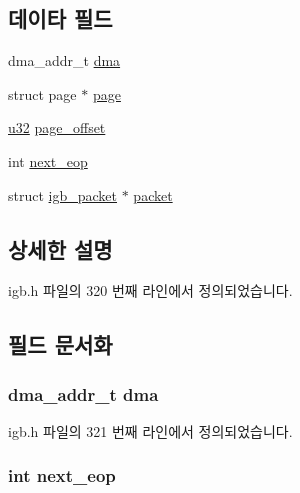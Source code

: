 \subsection*{데이타 필드}
\begin{DoxyCompactItemize}
\item 
dma\+\_\+addr\+\_\+t \hyperlink{structigb__rx__buffer_a5624e64f422a13783a01fb56a8e67747}{dma}
\item 
struct page $\ast$ \hyperlink{structigb__rx__buffer_ad45c9283ecdd581420d88bc33100364a}{page}
\item 
\hyperlink{lib_2igb_2e1000__osdep_8h_a64e91c10a0d8fb627e92932050284264}{u32} \hyperlink{structigb__rx__buffer_a4dde6949f38b527769892127f2e372d2}{page\+\_\+offset}
\item 
int \hyperlink{structigb__rx__buffer_af565101ee13ca100904a7ac5b7564a3d}{next\+\_\+eop}
\item 
struct \hyperlink{structigb__packet}{igb\+\_\+packet} $\ast$ \hyperlink{structigb__rx__buffer_ac6186670bb595d9f22c89b6dc2779d14}{packet}
\end{DoxyCompactItemize}


\subsection{상세한 설명}


igb.\+h 파일의 320 번째 라인에서 정의되었습니다.



\subsection{필드 문서화}
\subsubsection[{\texorpdfstring{dma}{dma}}]{\setlength{\rightskip}{0pt plus 5cm}dma\+\_\+addr\+\_\+t dma}\hypertarget{structigb__rx__buffer_a5624e64f422a13783a01fb56a8e67747}{}\label{structigb__rx__buffer_a5624e64f422a13783a01fb56a8e67747}


igb.\+h 파일의 321 번째 라인에서 정의되었습니다.

\subsubsection[{\texorpdfstring{next\+\_\+eop}{next_eop}}]{\setlength{\rightskip}{0pt plus 5cm}int next\+\_\+eop}\hypertarget{structigb__rx__buffer_af565101ee13ca100904a7ac5b7564a3d}{}\label{structigb__rx__buffer_af565101ee13ca100904a7ac5b7564a3d}


